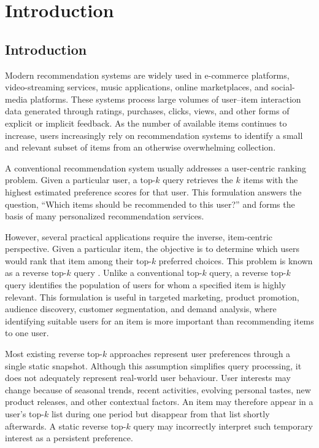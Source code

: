 
\chapter{Introduction}
\label{ch:introduction}


\section{Introduction}
\label{sec:introduction}

Modern recommendation systems are widely used in e-commerce platforms, video-streaming services, music applications, online marketplaces, and social-media platforms. These systems process large volumes of user--item interaction data generated through ratings, purchases, clicks, views, and other forms of explicit or implicit feedback. As the number of available items continues to increase, users increasingly rely on recommendation systems to identify a small and relevant subset of items from an otherwise overwhelming collection.

A conventional recommendation system usually addresses a user-centric ranking problem. Given a particular user, a top-$k$ query retrieves the $k$ items with the highest estimated preference scores for that user. This formulation answers the question, ``Which items should be recommended to this user?'' and forms the basis of many personalized recommendation services.

However, several practical applications require the inverse, item-centric perspective. Given a particular item, the objective is to determine which users would rank that item among their top-$k$ preferred choices. This problem is known as a reverse top-$k$ query \cite{reverse_topk}. Unlike a conventional top-$k$ query, a reverse top-$k$ query identifies the population of users for whom a specified item is highly relevant. This formulation is useful in targeted marketing, product promotion, audience discovery, customer segmentation, and demand analysis, where identifying suitable users for an item is more important than recommending items to one user.

Most existing reverse top-$k$ approaches represent user preferences through a single static snapshot. Although this assumption simplifies query processing, it does not adequately represent real-world user behaviour. User interests may change because of seasonal trends, recent activities, evolving personal tastes, new product releases, and other contextual factors. An item may therefore appear in a user's top-$k$ list during one period but disappear from that list shortly afterwards. A static reverse top-$k$ query may incorrectly interpret such temporary interest as a persistent preference.

